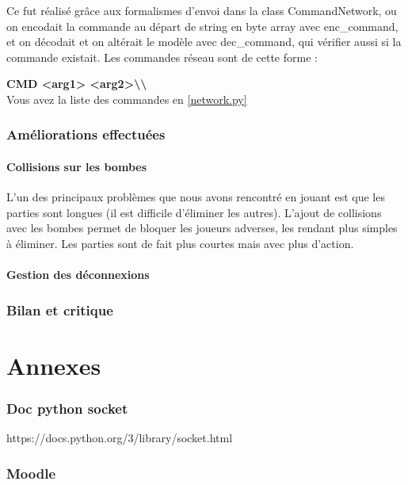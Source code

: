 \documentclass[a4paper]{article}
\begin{document}
		Ce fut réalisé grâce aux formalismes d'envoi dans la class CommandNetwork, ou on encodait la commande au départ de string en byte array avec enc_command, et on décodait et on altérait le modèle avec dec_command, qui vérifier aussi si la commande existait. Les commandes réseau sont de cette forme :
		
		\textbf{CMD <arg1> <arg2>\textbackslash\textbackslash}
		\\
		
		Vous avez la liste des commandes en \ref{network.py}

	\section{Améliorations effectuées}
		\subsection{Collisions sur les bombes}
		L'un des principaux problèmes que nous avons rencontré en jouant est que les parties sont longues (il est difficile d'éliminer les autres).
		L'ajout de collisions avec les bombes permet de bloquer les joueurs adverses, les rendant plus simples à éliminer.
		Les parties sont de fait plus courtes mais avec plus d'action.

		\subsection{Gestion des déconnexions}

	\section{Bilan et critique}

\newpage
\appendix
\part{Annexes}

\section{Doc python socket} \label{docpysoc}

https://docs.python.org/3/library/socket.html

\section{Moodle} \label{moodle}
\end{document}
